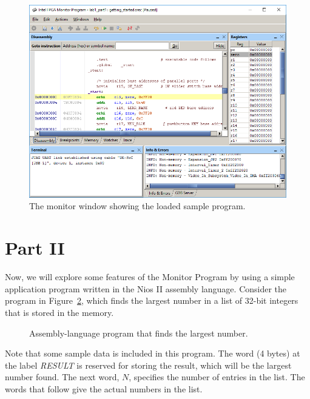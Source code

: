 \documentclass[epsfig,10pt,fullpage]{article}
\begin{document}
\begin{enumerate}
\begin{figure}[H]
	\begin{center}
	\includegraphics[scale=0.58]{figures/figureMP9.png}
	\end{center}
	\caption{The monitor window showing the loaded sample program.}
\label{fig:MP9}
\end{figure}

\end{enumerate}

\clearpage

\section*{Part II}
Now, we will explore some features of the Monitor Program by using a
simple application program written in the Nios II assembly language.
Consider the program in Figure~\ref{fig:code}, which finds the largest number in a list
of 32-bit integers that is stored in the memory.

\begin{figure}[H]
\begin{center}

\end{center}
\caption{Assembly-language program that finds the largest number.}
\label{fig:code}
\end{figure}

Note that some sample data is included in this program.
The word (4 bytes) at the label {\it RESULT} is reserved for storing the result, which will be 
the largest number found. The next word, $N$, specifies the number of entries in the list.
The words that follow give the actual numbers in the list.
\end{document}
